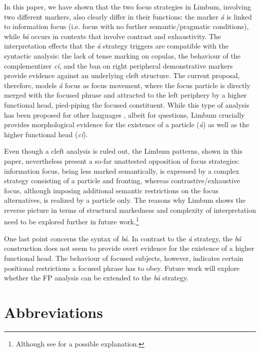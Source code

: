 \documentclass[output=paper,
modfonts
]{langscibook}
\begin{document}
In this paper, we have shown that the two focus strategies in Limbum, involving two different markers, also clearly differ in their functions: the marker \textit{á} is linked to information focus (i.e. focus with no further semantic/pragmatic conditions), while \textit{bá} occurs in contexts that involve contrast and exhaustivity. The interpretation effects that the {\em \'a} strategy triggers are compatible with the syntactic analysis: the lack of tense marking on copulas, the behaviour of the complementizer \textit{cí}, and the ban on right peripheral demonstrative markers provide evidence against an underlying cleft structure. The current proposal, therefore, models {\em\'a} focus as focus movement, where the focus particle is directly merged with the focused phrase and attracted to the left periphery by a higher functional head, pied-piping the focused constituent. While this type of analysis has been proposed for other languages \citep{Hagstrom1998,Cable2010}, albeit for questions, Limbum crucially provides morphological evidence for the existence of a particle ({\em \'a}) as well as the higher functional head ({\em c\'i}).

Even though a cleft analysis is ruled out, the Limbum patterns, shown in this paper, nevertheless present a so-far unattested opposition of focus strategies: information focus, being less marked semantically, is expressed by a complex strategy consisting of a particle and fronting, whereas contrastive/exhaustive focus, although imposing additional semantic restrictions on the focus alternatives, is realized by a particle only. The reasons why Limbum shows the reverse picture in terms of structural markedness and complexity of interpretation need to be explored further in future work.\footnote{Although see \citet{Driemeletal2017} for a possible explanation.}

One last point concerns the syntax of {\em b\'a}. In contrast to the {\em \'a} strategy, the {\em b\'a} construction does not seem to provide overt evidence for the existence of a higher functional head. The behaviour of focused subjects, however, indicates certain positional restrictions a focused phrase has to obey. Future work will explore whether the FP analysis can be extended to the {\em b\'a} strategy.


\section*{Abbreviations}
\end{document}
